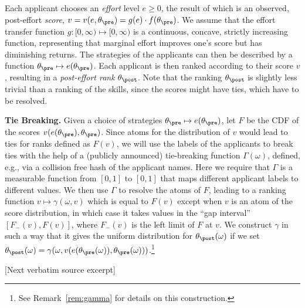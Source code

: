 \documentclass[10pt]{article}
\begin{document}
\begin{ReviewVerbatim}
Each applicant chooses an \textit{effort} level $e \ge 0$, the result of which is an observed, post-effort \textit{score}, {$v=v(e,\theta_\pre) = {g(e)}\cdot{f(\theta_\pre)}$}. 
{We assume} that the effort transfer function $g: [0, \infty) \mapsto [0, \infty)$ is a continuous, concave, strictly increasing function, representing that marginal effort improves one's score but has diminishing returns.
{%
{T}he strategies of the applicants can {then} be described by a function $\theta_\pre \mapsto e(\theta_\pre)$.
}
  Each {applicant} is then ranked according to their score $v$%
, resulting in a \textit{post-effort rank} $\theta_\post$.
Note that the ranking $\theta_\post$ is slightly less trivial than a ranking of the skills, since the scores might have ties, which have to be resolved.

{\textbf{Tie Breaking.}
Given a choice of strategies $\theta_\pre \mapsto e(\theta_\pre)$, let $F$ be the CDF of the scores $v(e(\theta_\pre),\theta_\pre)$.
Since atoms for the distribution of $v$ would lead to ties for ranks defined as $F(v)$, we will use the labels of the applicants to break ties with the help of a (publicly announced) tie-breaking function $\Gamma(\omega)$, defined, e.g., via a collision free hash of the applicant names. Here  we require  that $\Gamma$  is a measurable function from $[0,1]$ to $[0,1]$ that maps different applicant labels to different values.
We then use $\Gamma$ to resolve the atoms of $F$, leading to a ranking function $v\mapsto \gamma(\omega, v)$ which is equal to $F(v)$ except when $v$ is an atom of the score distribution, {in which case it takes values in the ``gap interval'' $[F_-(v),  F(v)]$, where $F_-(v)$ is the left limit of $F$ at $v$.}  We  construct $\gamma$ in such a way that it
gives the uniform distribution for $\theta_\post(\omega)$ if we set  $\theta_\post(\omega)=\gamma(\omega,v(e(\theta_\pre(\omega)),\theta_\pre(\omega)))$.\footnote{See Remark~\ref{rem:gamma} for details on this construction.}

[Next verbatim source excerpt]

}
\end{ReviewVerbatim}
\end{document}
